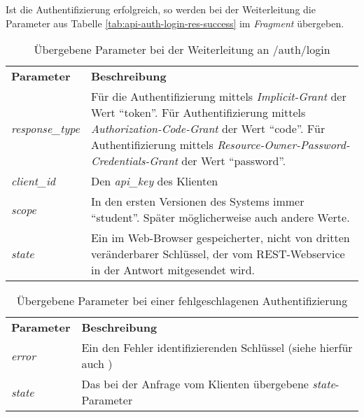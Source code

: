 Ist die Authentifizierung erfolgreich, so werden bei der Weiterleitung die Parameter aus Tabelle \ref{tab:api-auth-login-res-success} im \textit{Fragment} übergeben.
\begin{table}
	\begin{tabular}{@{} | p{.2\linewidth} | p{.75\linewidth} | @{}}
		\hline
		\textbf{Parameter} & \textbf{Beschreibung}\\ \hhline{|=|=|}
		\textit{response\_type} & Für die Authentifizierung mittels \textit{Implicit-Grant} der Wert \enquote{token}. Für Authentifizierung mittels \textit{Authorization-Code-Grant} der Wert \enquote{code}. Für Authentifizierung mittels \textit{Resource-Owner-Password-Credentials-Grant} der Wert \enquote{password}. \\ \hline
		\textit{client\_id} & Den \textit{api\_key} des Klienten \\ \hline
		\textit{scope} & In den ersten Versionen des Systems immer \enquote{student}. Später möglicherweise auch andere Werte. \\ \hline
		\textit{state} & Ein im Web-Browser gespeicherter, nicht von dritten veränderbarer Schlüssel, der vom REST-Webservice in der Antwort mitgesendet wird.\\
		\hline
	\end{tabular}
	\caption{Übergebene Parameter bei der Weiterleitung an /auth/login}
	\label{tab:api-auth-login-req-params}
\end{table}

\begin{table}
	\begin{tabular}{@{} | p{.2\linewidth} | p{.75\linewidth} | @{}}
		\hline
		\textbf{Parameter} & \textbf{Beschreibung}\\ \hhline{|=|=|}
		\textit{error} & Ein den Fehler identifizierenden Schlüssel (siehe hierfür auch \cite[Kap. 4.2.2.1]{rfc6749})\\ \hline
		\textit{state} & Das bei der Anfrage vom Klienten übergebene \textit{state}-Parameter\\
		\hline
	\end{tabular}
	\caption{Übergebene Parameter bei einer fehlgeschlagenen Authentifizierung}
	\label{tab:api-auth-login-res-error}
\end{table}

